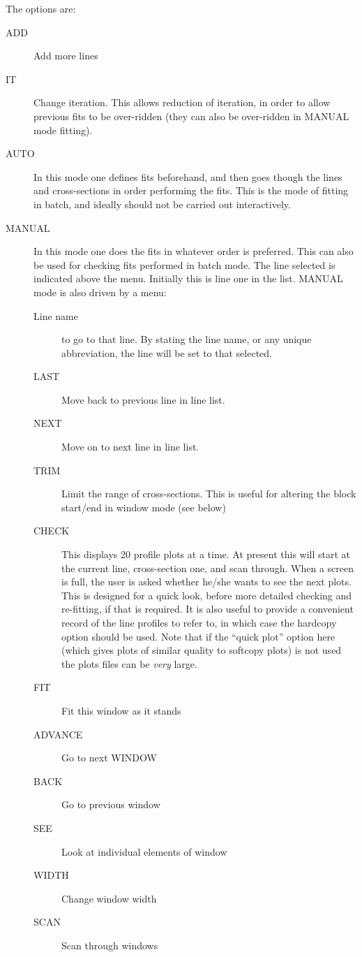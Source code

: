 \documentclass[11pt,twoside]{article}
\begin{document}
The options are:
\begin{description}
\item[ADD] Add more lines
\item[IT] Change iteration.
This allows reduction of iteration, in order to allow previous fits to
be over-ridden (they can also be over-ridden in MANUAL mode fitting).
\item[AUTO] In this mode one defines fits beforehand, and then goes
though the lines and cross-sections in order performing the fits.
This is the mode of fitting in batch, and ideally should not be carried
out interactively.
\item[MANUAL] In this mode one does the fits in whatever order is
preferred.
This can also be used for checking fits performed in batch mode.
The line selected is indicated above the menu.
Initially this is line one in the list.
MANUAL mode is also driven by a menu:
\begin{description}
\item[Line name] to go to that line.
By stating the line name, or any unique abbreviation, the line will be
set to that selected.
\item[LAST] Move back to previous line in line list.
\item[NEXT] Move on to next line in line list.
\item[TRIM] Limit the range of cross-sections.
This is useful for altering the block start/end in window mode (see
below)
\item[CHECK] This displays 20 profile plots at a time.
At present this will start at the current line, cross-section one, and
scan through.
When a screen is full, the user is asked whether he/she wants to see the
next plots.
This is designed for a quick look, before more detailed checking and
re-fitting, if that is required.
It is also useful to provide a convenient record of the line profiles to
refer to, in which case the hardcopy option should be used. Note that
if the ``quick plot'' option here (which gives plots of similar quality
to softcopy plots) is not used the plots files can be {\em very} large.
\item[FIT] Fit this window as it stands
\item[ADVANCE] Go to next WINDOW
\item[BACK] Go to previous window
\item[SEE] Look at individual elements of window
\item[WIDTH] Change window width
\item[SCAN] Scan through windows

\end{description}
\end{description}
\end{document}
